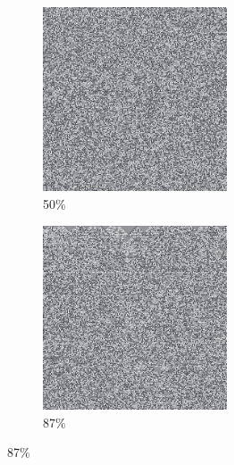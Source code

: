 \documentclass[12pt, fleqn]{report}                             %
\theoremstyle{break}                                            %
\begin{document}
\begin{figure}[ht!]
\begin{subfigure}[b]{0.4\linewidth}
          \includegraphics[width=0.6\textwidth]{Images/105/c.png}
          \caption{50\%}
        \end{subfigure}
        \begin{subfigure}[b]{0.4\linewidth}
          \includegraphics[width=0.6\textwidth]{Images/105/d.png}
          \caption{87\%}
        \end{subfigure}
      \end{figure}
\end{document}
